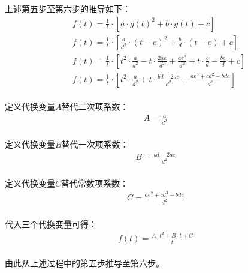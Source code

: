 \documentclass[UTF8]{ctexart}
\begin{document}
    上述第五步至第六步的推导如下：
    \begin{align}
        &f(t)=\frac{1}{t}\cdot\left[a\cdot g(t)^2+b\cdot g(t)+c\right]\\[4mm]
        &f(t)=\frac{1}{t}\cdot\left[\frac{a}{d^2}\cdot(t-e)^2+\frac{b}{d}\cdot(t-e)+c\right]\\[4mm]
        &f(t)=\frac{1}{t}\cdot\left[t^2\cdot\frac{a}{d^2}-t\cdot\frac{2ae}{d^2}+\frac{ae^2}{d^2}+t\cdot\frac{b}{d}-\frac{be}{d}+c\right]\\[4mm]
        &f(t)=\frac{1}{t}\cdot\left[t^2\cdot\frac{a}{d^2}+t\cdot\frac{bd-2ae}{d^2}+\frac{ae^2+cd^2-bde}{d^2}\right]
    \end{align}\\
    定义代换变量$A$替代二次项系数：
    \begin{align}
        A=\frac{a}{d^2}
    \end{align}\\
    定义代换变量$B$替代一次项系数：
    \begin{align}
        B=\frac{bd-2ae}{d^2}
    \end{align}\\
    定义代换变量$C$替代常数项系数：
    \begin{align}
        C=\frac{ae^2+cd^2-bde}{d^2}
    \end{align}\\
    代入三个代换变量可得：
    \begin{align}
        f(t)=\frac{A\cdot t^2+B\cdot t+C}{t}
    \end{align}\\
    由此从上述过程中的第五步推导至第六步。

\newpage
\end{document}
